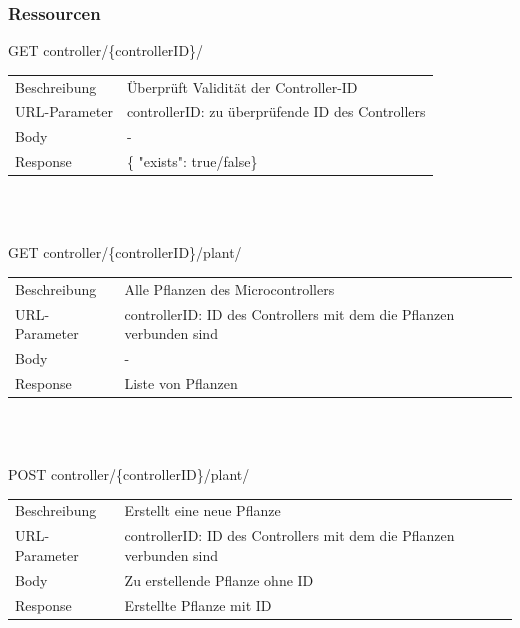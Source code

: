         \subsubsection{Ressourcen}
        \newcommand{\tabitem}{~~\llap{\textbullet}~~}
     \begin{minipage}{\textwidth}
             GET controller/\{controllerID\}/ 
        
          \begin{tabularx}{\textwidth}{lX}
                \toprule Beschreibung & Überprüft Validität der Controller-ID \\
                URL-Parameter & controllerID: zu überprüfende ID des Controllers \\
                Body & - \\
                Response & \{ "exists": true/false\}
            \end{tabularx}
    \end{minipage}\\\\
        
     \begin{minipage}{\textwidth}
            GET controller/\{controllerID\}/plant/ 

          \begin{tabularx}{\textwidth}{lX}
                \toprule Beschreibung & Alle Pflanzen des Microcontrollers \\
                URL-Parameter & controllerID: ID des Controllers mit dem die Pflanzen verbunden sind \\
                Body & - \\
                Response & Liste von Pflanzen
            \end{tabularx}
    \end{minipage}\\\\
        
     \begin{minipage}{\textwidth}
             POST  controller/\{controllerID\}/plant/ 
         
          \begin{tabularx}{\textwidth}{lX}
             \toprule Beschreibung & Erstellt eine neue Pflanze \\
             URL-Parameter & controllerID: ID des Controllers mit dem die Pflanzen verbunden sind \\
             Body & Zu erstellende Pflanze ohne ID \\
             Response & Erstellte Pflanze mit ID
         \end{tabularx}
    \end{minipage}\\\\
     
